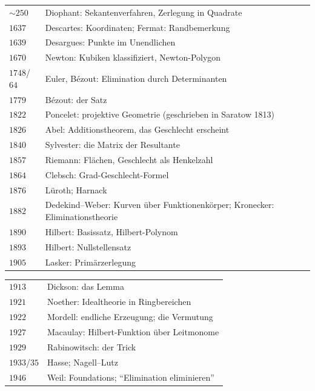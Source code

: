 \begin{merksatz}
\begin{center}
{\small
\renewcommand{\arraystretch}{1.42}
\begin{tabular}{@{}P{1.2cm}P{7.4cm}@{}}
\toprule
$\sim250$ & Diophant: Sekantenverfahren, Zerlegung in Quadrate\\
$1637$ & Descartes: Koordinaten; Fermat: Randbemerkung\\
$1639$ & Desargues: Punkte im Unendlichen\\
$1670$ & Newton: Kubiken klassifiziert, Newton-Polygon\\
$1748$/$64$ & Euler, Bézout: Elimination durch Determinanten\\
$1779$ & Bézout: der Satz\\
$1822$ & Poncelet: projektive Geometrie (geschrieben in Saratow 1813)\\
$1826$ & Abel: Additionstheorem, das Geschlecht erscheint\\
$1840$ & Sylvester: die Matrix der Resultante\\
$1857$ & Riemann: Flächen, Geschlecht als Henkelzahl\\
$1864$ & Clebsch: Grad-Geschlecht-Formel\\
$1876$ & Lüroth; Harnack\\
$1882$ & Dedekind--Weber: Kurven über Funktionenkörper; Kronecker: Eliminationstheorie\\
$1890$ & Hilbert: Basissatz, Hilbert-Polynom\\
$1893$ & Hilbert: Nullstellensatz\\
$1905$ & Lasker: Primärzerlegung\\
\bottomrule
\end{tabular}}
\end{center}
\begin{center}
{\small
\renewcommand{\arraystretch}{1.42}
\begin{tabular}{@{}P{1.2cm}P{7.4cm}@{}}
\toprule
$1913$ & Dickson: das Lemma\\
$1921$ & Noether: Idealtheorie in Ringbereichen\\
$1922$ & Mordell: endliche Erzeugung; die Vermutung\\
$1927$ & Macaulay: Hilbert-Funktion über Leitmonome\\
$1929$ & Rabinowitsch: der Trick\\
$1933$/$35$ & Hasse; Nagell--Lutz\\
$1946$ & Weil: Foundations; \enquote{Elimination eliminieren}\\

\end{tabular}}
\end{center}
\end{merksatz}
